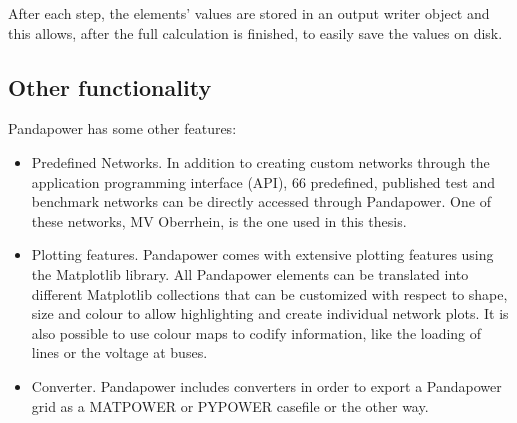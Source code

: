After each step, the elements' values are stored in an output writer object and this allows, after the full calculation is finished, to easily save the values on disk.

\subsection{Other functionality}
Pandapower has some other features:
\begin{itemize}
    \item Predefined Networks. In addition to creating custom networks through the application programming interface (\gls{API}), 66 predefined, published test and benchmark networks can be directly accessed through Pandapower. One of these networks, MV Oberrhein, is the one used in this thesis.
    \item Plotting features. Pandapower comes with extensive plotting features using the Matplotlib library. All Pandapower elements can be translated into different Matplotlib collections that can be customized with respect to shape, size and colour to allow highlighting and create individual network plots. It is also possible to use colour maps to codify information, like the loading of lines or the voltage at buses.
    \item Converter. Pandapower includes converters in order to export a Pandapower grid as a MATPOWER or PYPOWER casefile or the other way.
\end{itemize}